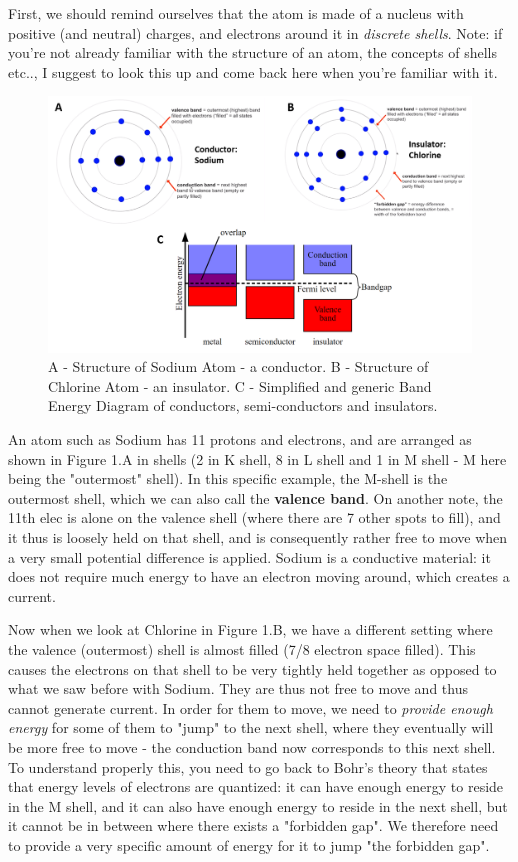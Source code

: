 First, we should remind ourselves that the atom is made of a nucleus with positive (and neutral) charges, and electrons around it in \textit{discrete shells}. Note: if you're not already familiar with the structure of an atom, the concepts of shells etc.., I suggest to look this up and come back here when you're familiar with it.

\begin{figure}[H]
    \centering
    \includegraphics[width=0.95\linewidth]{../../Figures/Conduction_Energy_Band_Diagrams.PNG}
    \caption{A - Structure of Sodium Atom - a conductor. B - Structure of Chlorine Atom - an insulator. C - Simplified and generic Band Energy Diagram of conductors, semi-conductors and insulators.}
    \label{fig:basalandcerebellum}
\end{figure}


An atom such as Sodium has 11 protons and electrons, and are arranged as shown in Figure 1.A in shells (2 in K shell, 8 in L shell and 1 in M shell - M here being the "outermost" shell).  In this specific example, the M-shell is the outermost shell, which we can also call the \textbf{valence band}. On another note, the 11th elec is alone on the valence shell (where there are 7 other spots to fill), and it thus is loosely held on that shell, and is consequently rather free to move when a very small potential difference is applied. Sodium is a conductive material: it does not require much energy to have an electron moving around, which creates a current.

Now when we look at Chlorine in Figure 1.B, we have a different setting where the valence (outermost) shell is almost filled (7/8 electron space filled). This causes the electrons on that shell to be very tightly held together as opposed to what we saw before with Sodium. They are thus not free to move and thus cannot generate current. In order for them to move, we need to \textit{provide enough energy} for some of them to "jump" to the next shell, where they eventually will be more free to move - the conduction band now corresponds to this next shell. To understand properly this, you need to go back to Bohr's theory that states that energy levels of electrons are quantized: it can have enough energy to reside in the M shell, and it can also have enough energy to reside in the next shell, but it cannot be in between where there exists a "forbidden gap". We therefore need to provide a very specific amount of energy for it to jump "the forbidden gap".   

